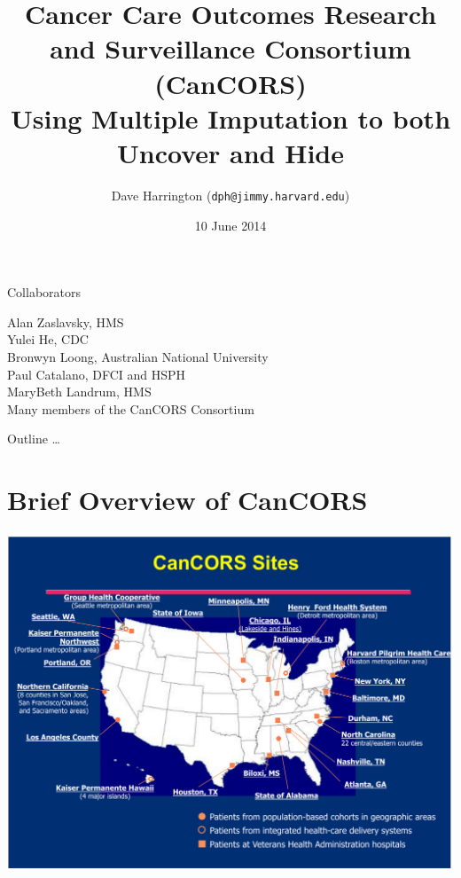 \documentclass[11pt,handout]{beamer}
\title[CanCORS]%
{Cancer Care Outcomes Research and Surveillance Consortium \\
(CanCORS) \\ \vspace{0.4in}
Using Multiple Imputation to both Uncover and Hide}
\author[Harrington]{Dave Harrington (\texttt{dph@jimmy.harvard.edu}) }
\institute %
[DFCI/Harvard] {{\color{darkgreen} Dana-Farber Cancer Institute, Harvard Statistics and Biostatistics}}
\date{10 June 2014}
\begin{document}
\begin{frame}

  \titlepage

\end{frame}

\begin{frame}{Collaborators}

Alan Zaslavsky, HMS \\
\medskip
Yulei He, CDC \\
\medskip
Bronwyn Loong, Australian National University \\
\medskip
Paul Catalano, DFCI and HSPH \\
\medskip
MaryBeth Landrum, HMS \\
\medskip
Many members of the CanCORS Consortium

	
\end{frame}

\begin{frame}{Outline \dots}
\tableofcontents
\end{frame}


\section{Brief Overview of CanCORS}

\begin{frame}[plain]

\begin{center}
\includegraphics[width= 1.0\textwidth]{./figures/cancors_sites.pdf}
\end{center}

\end{frame}
\end{document}
